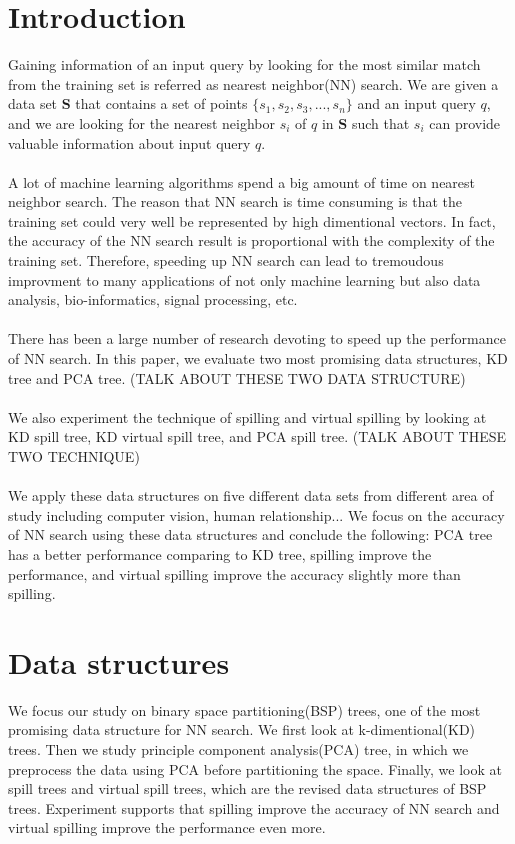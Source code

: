 \documentclass[paper=letter, fontsize=12pt]{article} %
\begin{document}
\section{Introduction}
Gaining information of an input query by looking for the most similar match from the training set is referred as nearest neighbor(NN) search. We are given a data set $\mathbf S$ that contains a set of points $\{ s_1, s_2, s_3, ... , s_n\}$ and an input query $q$, and we are looking for the nearest neighbor $s_i$ of $q$ in $\mathbf S$ such that $s_i$ can provide valuable information about input query $q$.
\\~\\
A lot of machine learning algorithms spend a big amount of time on nearest neighbor search. The reason that NN search is time consuming is that the training set could very well be represented by high dimentional vectors. In fact, the accuracy of the NN search result is proportional with the complexity of the training set. Therefore, speeding up NN search can lead to tremoudous improvment to many applications of not only machine learning but also data analysis, bio-informatics, signal processing, etc.
\\~\\
There has been a large number of research devoting to speed up the performance of NN search. In this paper, we evaluate two most promising data structures, KD tree and PCA tree. (TALK ABOUT THESE TWO DATA STRUCTURE)
\\~\\
We also experiment the technique of spilling and virtual spilling by looking at KD spill tree, KD virtual spill tree, and PCA spill tree. (TALK ABOUT THESE TWO TECHNIQUE)
\\~\\
We apply these data structures on five different data sets from different area of study including computer vision, human relationship... We focus on the accuracy of NN search using these data structures and conclude the following: PCA tree has a better performance comparing to KD tree, spilling improve the performance, and virtual spilling improve the accuracy slightly more than spilling.

\section{Data structures}
We focus our study on binary space partitioning(BSP) trees, one of the most promising data structure for NN search. We first look at k-dimentional(KD) trees. Then we study principle component analysis(PCA) tree, in which we preprocess the data using PCA before partitioning the space. Finally, we look at spill trees and virtual spill trees, which are the revised data structures of BSP trees. Experiment supports that spilling improve the accuracy of NN search and virtual spilling improve the performance even more.
\end{document}
